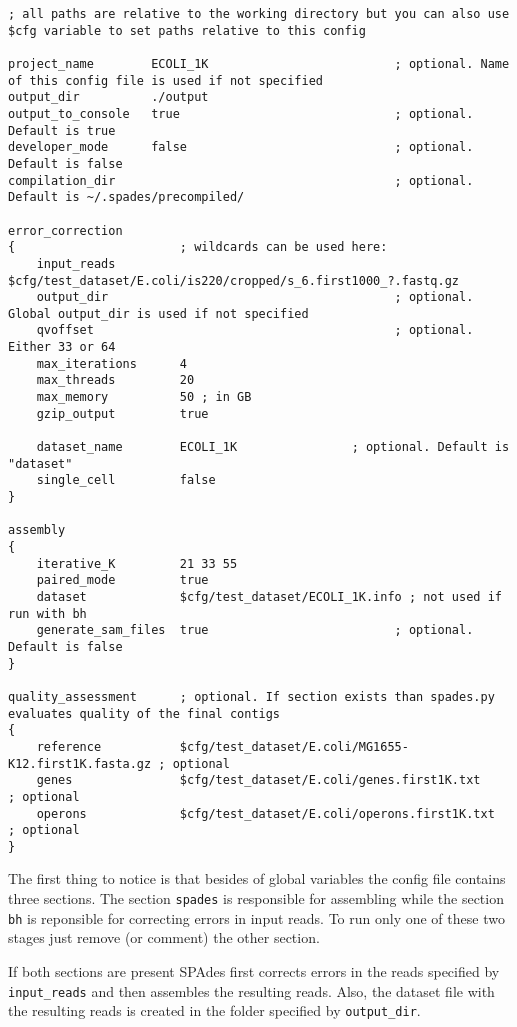 \documentclass{article}
\def\spades{SPAdes}
\begin{document}
\begin{lstlisting}													
; all paths are relative to the working directory but you can also use $cfg variable to set paths relative to this config

project_name        ECOLI_1K                          ; optional. Name of this config file is used if not specified
output_dir          ./output
output_to_console   true                              ; optional. Default is true
developer_mode      false                             ; optional. Default is false
compilation_dir                                       ; optional. Default is ~/.spades/precompiled/

error_correction
{                       ; wildcards can be used here:
    input_reads         $cfg/test_dataset/E.coli/is220/cropped/s_6.first1000_?.fastq.gz
    output_dir                                        ; optional. Global output_dir is used if not specified
    qvoffset                                          ; optional. Either 33 or 64
    max_iterations      4
    max_threads         20
    max_memory          50 ; in GB
    gzip_output         true

    dataset_name        ECOLI_1K                ; optional. Default is "dataset"
    single_cell         false
}

assembly
{
    iterative_K         21 33 55
    paired_mode         true
    dataset             $cfg/test_dataset/ECOLI_1K.info ; not used if run with bh
    generate_sam_files  true                          ; optional. Default is false
}

quality_assessment      ; optional. If section exists than spades.py evaluates quality of the final contigs
{
    reference           $cfg/test_dataset/E.coli/MG1655-K12.first1K.fasta.gz ; optional
    genes               $cfg/test_dataset/E.coli/genes.first1K.txt           ; optional
    operons             $cfg/test_dataset/E.coli/operons.first1K.txt         ; optional
}
\end{lstlisting}

The first thing to notice is that besides of global variables the config file contains three sections. The section {\tt spades} is responsible for assembling
while the section {\tt bh} is reponsible for correcting errors in input reads.
To run only one of these two stages just remove (or comment) the other section.

If both sections are present {\spades} first corrects errors in the reads specified by {\tt input\_reads} and then assembles the resulting reads. Also, the dataset file
with the resulting reads is created in the folder specified by {\tt output\_dir}.
\end{document}
